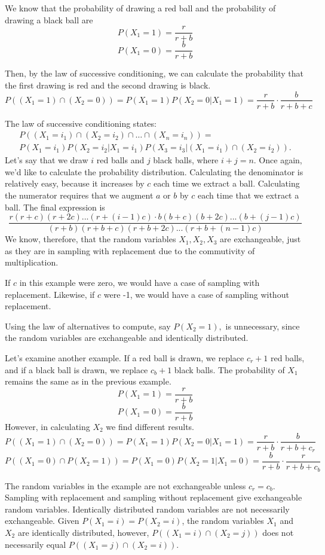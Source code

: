 We know that the probability of drawing a red ball and the probability of drawing a black ball are  $$P(X_1 = 1) = \frac {r}{r+b}$$
$$P(X_1 = 0) = \frac {b}{r+b}$$

Then, by the law of successive conditioning, we can calculate the probability that the first drawing is red and the second drawing is black.
$$P((X_1 = 1) \cap (X_2 = 0))  =  P(X_1 = 1)P(X_2 = 0|X_1 = 1)  = \frac {r}{r+b} \cdot \frac {b}{r+b+c}$$

The law of successive conditioning states:
\begin{eqnarray*}
P((X_1 = i_1) \cap (X_2 = i_2) \cap \ldots \cap(X_n = i_n)) = \\
P(X_1 = i_1) P(X_2=i_2|X_1= i_1)P(X_3=i_3|(X_1 = i_1) \cap (X_2 = i_2)).
\end{eqnarray*}
Let's say that we draw $i$ red balls and $j$ black balls, where $i+j=n$.  Once again, we'd like to calculate the probability distribution.  Calculating the denominator is relatively easy, because it increases by $c$ each time we extract a ball.  Calculating the numerator requires that we augment $a$ or $b$ by $c$ each time that we extract a ball.  The final expression is
$$\frac{r(r+c)(r+2c)...(r+(i-1)c)\cdot b(b+c)(b+2c)...(b+(j-1)c)}{(r+b)(r+b+c)(r+b+2c)...(r+b+(n-1)c)}$$ 
We know, therefore, that the random variables $X_1, X_2, X_3$ are exchangeable, just as they are in sampling with replacement due to the commutivity of multiplication.

If $c$ in this example were zero, we would have a case of sampling with replacement.  Likewise, if $c$ were -1, we would have a case of sampling without replacement.

Using the law of alternatives to compute, say $P(X_2 = 1),$ is unnecessary, since the random variables are exchangeable and identically distributed.

Let's examine another example.  If a red ball is drawn, we replace $c_r + 1$ red balls, and if a black ball is drawn, we replace $c_b + 1$ black balls.  The probability of $X_1$ remains the same as in the previous example.  $$P(X_1 = 1) = \frac{r}{r+b}$$
$$P(X_1=0)=\frac{b}{r+b}$$
However, in calculating $X_2$ we find different results.  $$P((X_1=1) \cap (X_2 = 0)) = P(X_1= 1)P(X_2=0|X_1=1)=\frac{r}{r+b} \cdot \frac{b}{r+b+c_r}$$
$$P((X_1=0) \cap P(X_2=1)) =P(X_1=0)P(X_2=1|X_1=0) =  \frac {b}{r+b} \cdot \frac{r}{r+b+c_b}$$

The random variables in the example are not exchangeable unless $c_r = c_b$.  Sampling with replacement and sampling without replacement give exchangeable random variables.  Identically distributed random variables are not necessarily exchangeable.  Given $P(X_1 = i) = P(X_2 = i)$, the random variables $X_1$ and $X_2$ are identically distributed, however, $P((X_1= i) \cap (X_2 =j))$ does not necessarily equal $P((X_1 = j) \cap (X_2 = i))$.


